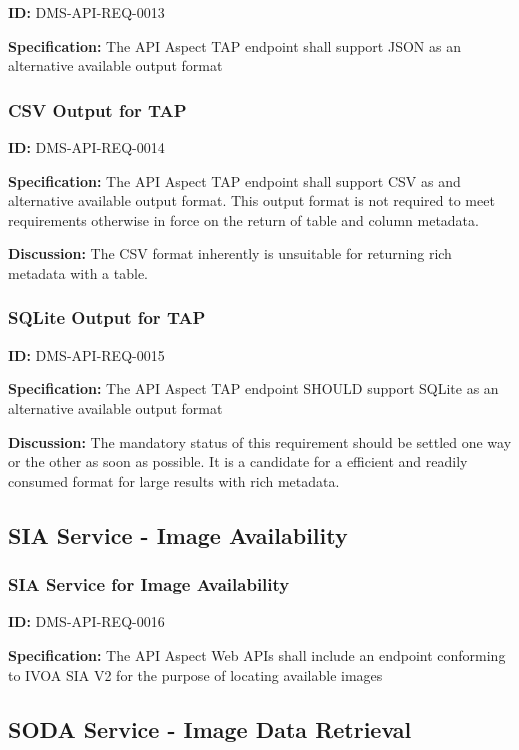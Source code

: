 \documentclass[SE,toc,lsstdraft]{lsstdoc}
\begin{document}
\label{DMS-API-REQ-0013}
\textbf{ID:} DMS-API-REQ-0013

\textbf{Specification:}
The API Aspect TAP endpoint shall support JSON as an alternative available output format

\subsubsection{CSV Output for TAP}

\label{DMS-API-REQ-0014}
\textbf{ID:} DMS-API-REQ-0014

\textbf{Specification:}
The API Aspect TAP endpoint shall support CSV as and alternative available output format.  This output format is not required to meet requirements otherwise in force on the return of table and column metadata.

\textbf{Discussion:}
The CSV format inherently is unsuitable for returning rich metadata with a table.

\subsubsection{SQLite Output for TAP}

\label{DMS-API-REQ-0015}
\textbf{ID:} DMS-API-REQ-0015

\textbf{Specification:}
The API Aspect TAP endpoint SHOULD support SQLite as an alternative available output format

\textbf{Discussion:}
The mandatory status of this requirement should be settled one way or the other as soon as possible.  It is a candidate for a efficient and readily consumed format for large results with rich metadata.

\subsection{SIA Service - Image Availability}

\subsubsection{SIA Service for Image Availability}

\label{DMS-API-REQ-0016}
\textbf{ID:} DMS-API-REQ-0016

\textbf{Specification:}
The API Aspect Web APIs shall include an endpoint conforming to IVOA SIA V2 for the purpose of locating available images

\subsection{SODA Service - Image Data Retrieval}
\end{document}
